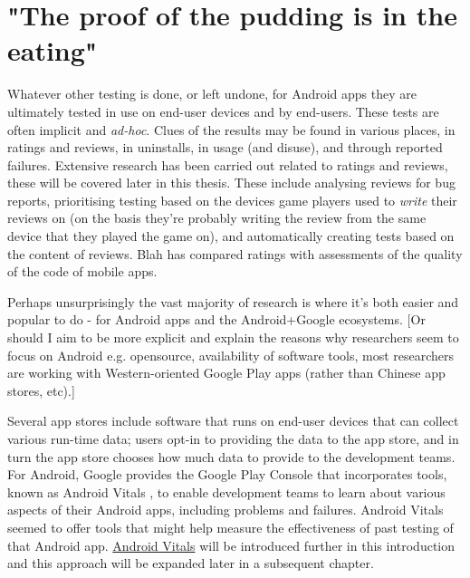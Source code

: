 \section{"The proof of the pudding is in the eating"}
Whatever other testing is done, or left undone, for Android apps they are ultimately tested in use on end-user devices and by end-users. These tests are often implicit and \textit{ad-hoc}. Clues of the results may be found in various places, in ratings and reviews, in uninstalls, in usage (and disuse), and through reported failures. Extensive research has been carried out related to ratings and reviews, these will be covered later in this thesis. %
These include analysing reviews for bug reports, %
prioritising testing based on the devices game players used to \textit{write} their reviews on (on the basis they're probably writing the review from the same device that they played the game on), %
and automatically creating tests based on the content of reviews. %
Blah has compared ratings with assessments of the quality of the code of mobile apps. %

Perhaps unsurprisingly the vast majority of research is where it's both easier and popular to do - for Android apps and the Android+Google ecosystems. [Or should I aim to be more explicit and explain the reasons why researchers seem to focus on Android e.g. opensource, availability of software tools, most researchers are working with Western-oriented Google Play apps (rather than Chinese app stores, etc).]

Several app stores include software that runs on end-user devices that can collect various run-time data; users opt-in to providing the data to the app store, and in turn the app store chooses how much data to provide to the development teams. For Android, Google provides the Google Play Console that incorporates tools, known as Android Vitals %
, to enable development teams to learn about various aspects of their Android apps, including problems and failures. Android Vitals seemed to offer tools that might help measure the effectiveness of past testing of that Android app. \hyperlink{android_vitals}{Android Vitals} will be introduced further in this introduction and this approach will be expanded later in a subsequent chapter. %


